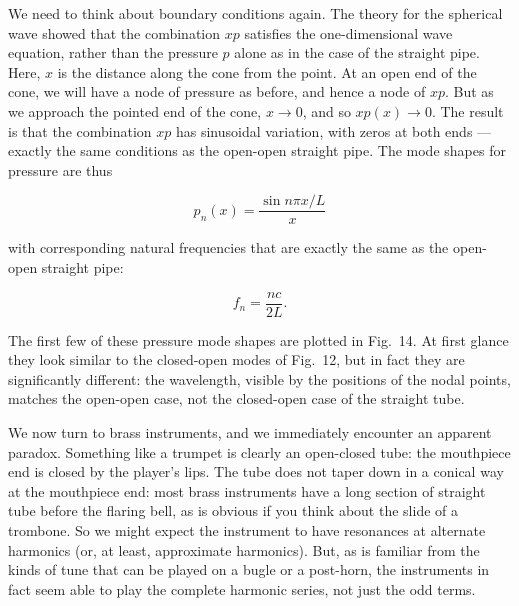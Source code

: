 
  We need to think about boundary conditions again. The theory for the 
  spherical wave showed that the combination $xp$ satisfies the one-dimensional 
  wave equation, rather than the pressure $p$ alone as in the case of the 
  straight pipe. Here, $x$ is the distance along the cone from the point. At an 
  open end of the cone, we will have a node of pressure as before, and hence a 
  node of $xp$. But as we approach the pointed end of the cone, $x \rightarrow 
  0$, and so $xp(x) \rightarrow 0$. The result is that the combination $xp$ has 
  sinusoidal variation, with zeros at both ends --- exactly the same conditions 
  as the open-open straight pipe. The mode shapes for pressure are thus 

  $$p_n(x)=\dfrac{\sin n \pi x/L}{x} \tag{3}$$ 

  with corresponding natural frequencies that are exactly the same as the 
  open-open straight pipe: 

  $$f_n=\frac{nc}{2L} . \tag{4}$$ 

  The first few of these pressure mode shapes are plotted in Fig.\ 14. At first 
  glance they look similar to the closed-open modes of Fig.\ 12, but in fact 
  they are significantly different: the wavelength, visible by the positions of 
  the nodal points, matches the open-open case, not the closed-open case of the 
  straight tube. 


  We now turn to brass instruments, and we immediately encounter an apparent 
  paradox. Something like a trumpet is clearly an open-closed tube: the 
  mouthpiece end is closed by the player's lips. The tube does not taper down 
  in a conical way at the mouthpiece end: most brass instruments have a long 
  section of straight tube before the flaring bell, as is obvious if you think 
  about the slide of a trombone. So we might expect the instrument to have 
  resonances at alternate harmonics (or, at least, approximate harmonics). But, 
  as is familiar from the kinds of tune that can be played on a bugle or a 
  post-horn, the instruments in fact seem able to play the complete harmonic 
  series, not just the odd terms. 

